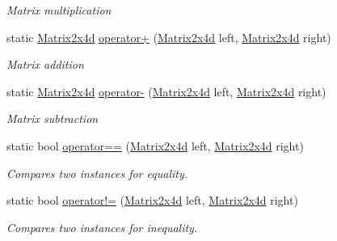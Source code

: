 \begin{DoxyCompactItemize}
\begin{DoxyCompactList}\small\item\em Matrix multiplication \end{DoxyCompactList}\item 
static \hyperlink{struct_open_t_k_1_1_matrix2x4d}{Matrix2x4d} \hyperlink{struct_open_t_k_1_1_matrix2x4d_a2edb96b1b069489cfd908c6205f7e63d}{operator+} (\hyperlink{struct_open_t_k_1_1_matrix2x4d}{Matrix2x4d} left, \hyperlink{struct_open_t_k_1_1_matrix2x4d}{Matrix2x4d} right)
\begin{DoxyCompactList}\small\item\em Matrix addition \end{DoxyCompactList}\item 
static \hyperlink{struct_open_t_k_1_1_matrix2x4d}{Matrix2x4d} \hyperlink{struct_open_t_k_1_1_matrix2x4d_ae589655bca0f303ae45df32c8847d949}{operator-\/} (\hyperlink{struct_open_t_k_1_1_matrix2x4d}{Matrix2x4d} left, \hyperlink{struct_open_t_k_1_1_matrix2x4d}{Matrix2x4d} right)
\begin{DoxyCompactList}\small\item\em Matrix subtraction \end{DoxyCompactList}\item 
static bool \hyperlink{struct_open_t_k_1_1_matrix2x4d_afbdaa580707b2c2542e5c5ef48231e14}{operator==} (\hyperlink{struct_open_t_k_1_1_matrix2x4d}{Matrix2x4d} left, \hyperlink{struct_open_t_k_1_1_matrix2x4d}{Matrix2x4d} right)
\begin{DoxyCompactList}\small\item\em Compares two instances for equality. \end{DoxyCompactList}\item 
static bool \hyperlink{struct_open_t_k_1_1_matrix2x4d_afddb5c1ac13a4da18e1e7891692407dc}{operator!=} (\hyperlink{struct_open_t_k_1_1_matrix2x4d}{Matrix2x4d} left, \hyperlink{struct_open_t_k_1_1_matrix2x4d}{Matrix2x4d} right)
\begin{DoxyCompactList}\small\item\em Compares two instances for inequality. \end{DoxyCompactList}\end{DoxyCompactItemize}
